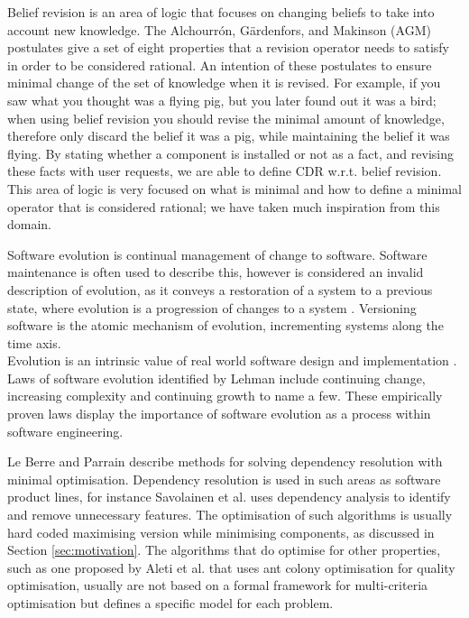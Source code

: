 Belief revision is an area of logic that focuses on changing beliefs to take into account new knowledge.
The Alchourr\'on, G\"ardenfors, and Makinson (AGM) \cite{alchourron1985logic} postulates give a set of eight properties 
that a revision operator needs to satisfy in order to be considered rational.
An intention of these postulates to ensure minimal change of the set of knowledge when it is revised.
For example, if you saw what you thought was a flying pig, but you later found out it was a bird;
when using belief revision you should revise the minimal amount of knowledge, therefore only discard the belief it was a pig, 
while maintaining the belief it was flying.
By stating whether a component is installed or not as a fact,
and revising these facts with user requests, we are able to define CDR w.r.t. belief revision.
This area of logic is very focused on what is minimal and how to define a minimal operator that is considered rational; 
we have taken much inspiration from this domain.




Software evolution is continual management of change to software. 
Software maintenance is often used to describe this,
however is considered an invalid description of evolution, as it conveys a
restoration of a system to a previous state, where evolution is a progression
of changes to a system \cite{lehman_software_2006}. Versioning software is the atomic mechanism of evolution, 
incrementing systems along the time axis.\\ 
Evolution is an intrinsic value of real world software
design and implementation \cite{lehman_programs_1980}. Laws of software
evolution identified by Lehman include continuing change, increasing complexity and
continuing growth \cite{lehman_rules_2001} to name a few. These empirically proven laws
display the importance of software evolution as a process within software
engineering.

Le Berre and Parrain \cite{Berre2008} describe methods for solving dependency resolution with minimal optimisation.
Dependency resolution is used in such areas as software product lines,
for instance Savolainen et al. \cite{savolainen_analyzing_2007} uses dependency analysis to identify and remove unnecessary features.
The optimisation of such algorithms is usually hard coded maximising version while minimising components, 
as discussed in Section \ref{sec:motivation}.
The algorithms that do optimise for other properties, 
such as one proposed by Aleti et al. \cite{Aleti2009} that uses ant colony optimisation for quality optimisation,
usually are not based on a formal framework for multi-criteria optimisation but defines a specific model for each problem.


